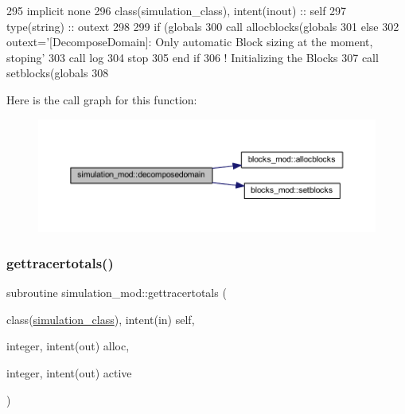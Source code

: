 \begin{DoxyCode}
295     \textcolor{keywordtype}{implicit none}
296     \textcolor{keywordtype}{class}(simulation\_class), \textcolor{keywordtype}{intent(inout)} :: self
297     \textcolor{keywordtype}{type}(string) :: outext
298 
299     \textcolor{keywordflow}{if} (globals%
300         \textcolor{keyword}{call }allocblocks(globals%
301     \textcolor{keywordflow}{else}
302         outext=\textcolor{stringliteral}{'[DecomposeDomain]: Only automatic Block sizing at the moment, stoping'}
303         \textcolor{keyword}{call }log%
304         stop
305 \textcolor{keywordflow}{    end if}
306     \textcolor{comment}{! Initializing the Blocks}
307     \textcolor{keyword}{call }setblocks(globals%
308 
\end{DoxyCode}
Here is the call graph for this function\+:\nopagebreak
\begin{figure}[H]
\begin{center}
\leavevmode
\includegraphics[width=350pt]{namespacesimulation__mod_a2b8198a9fb3f7671c6b45192a0b9740c_cgraph}
\end{center}
\end{figure}
\mbox{\label{namespacesimulation__mod_ab40f39c4bf37da066101f93b67ad9b26}} 
\subsubsection{\texorpdfstring{gettracertotals()}{gettracertotals()}}
{\footnotesize\ttfamily subroutine simulation\+\_\+mod\+::gettracertotals (\begin{DoxyParamCaption}\item[{class(\mbox{\hyperlink{structsimulation__mod_1_1simulation__class}{simulation\+\_\+class}}), intent(in)}]{self,  }\item[{integer, intent(out)}]{alloc,  }\item[{integer, intent(out)}]{active }\end{DoxyParamCaption})\hspace{0.3cm}{\ttfamily [private]}}



